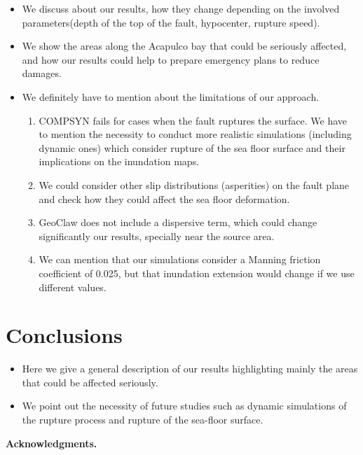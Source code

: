 \documentclass[preprint,review,12pt]{elsarticle}
\newcommand{\compsyn}{COMPSYN\xspace}
\begin{document}
\begin{itemize}
  \item We discuss about our results, how they change depending on the involved parameters(depth of the top of the fault, hypocenter, rupture speed).
  \item We show the areas along the Acapulco bay that could be seriously affected, and how our results could help to prepare emergency plans to reduce damages. 
  \item We definitely have to mention about the limitations of our approach. 

  \begin{enumerate}
   \item \compsyn fails for cases when the fault ruptures  the surface. We have to mention the necessity to conduct more realistic simulations (including dynamic ones) which consider rupture of the sea floor surface and their implications on the inundation maps. 
   \item We could consider other slip distributions (asperities) on the fault plane and check how they could affect the sea floor deformation.
   \item GeoClaw does not include a dispersive term, which could change significantly our results, specially near the source area.
   \item We can mention that our simulations consider a Manning friction coefficient of 0.025, but that inundation extension would change if we use different values.
  \end{enumerate}

\end{itemize}
  
\section{Conclusions} \label{sec:conclusions}

\begin{itemize}
\item Here we give a general description of our results highlighting mainly the areas that could be affected seriously. 
  \item We point out the necessity of future studies such as dynamic simulations of the rupture process and rupture of the sea-floor surface.
\end{itemize}

\vskip 10pt
{\bf Acknowledgments.}




\end{document}
